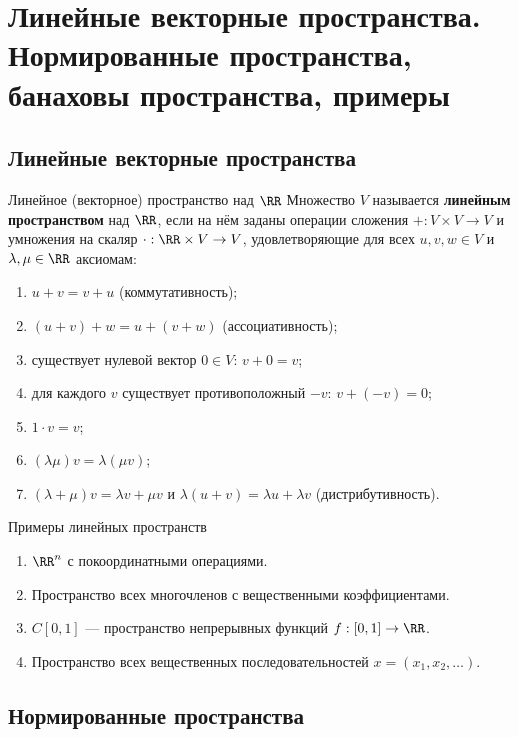 
\section{Линейные векторные пространства. Нормированные пространства, банаховы пространства, примеры}

\subsection*{Линейные векторные пространства}

\begin{Definition}{Линейное (векторное) пространство над $\RR$}{}
	Множество $V$ называется \textbf{линейным пространством} над $\RR$, если на
	нём заданы операции сложения $+:V\times V\to V$ и умножения на скаляр
	$\cdot:\RR\times V\to V$, удовлетворяющие для всех $u,v,w\in V$ и
	$\lambda,\mu\in\RR$ аксиомам:
	\begin{enumerate}
		\item $u+v=v+u$ (коммутативность);
		\item $(u+v)+w=u+(v+w)$ (ассоциативность);
		\item существует нулевой вектор $0\in V$: $v+0=v$;
		\item для каждого $v$ существует противоположный $-v$: $v+(-v)=0$;
		\item $1\cdot v=v$;
		\item $(\lambda\mu)v=\lambda(\mu v)$;
		\item $(\lambda+\mu)v=\lambda v+\mu v$ и $\lambda(u+v)=\lambda u+\lambda v$
		(дистрибутивность).
	\end{enumerate}
\end{Definition}

\begin{Example}{Примеры линейных пространств}{}
	\begin{enumerate}
		\item $\RR^n$ с покоординатными операциями.
		\item Пространство всех многочленов с вещественными коэффициентами.
		\item $C[0,1]$ --- пространство непрерывных функций $f:[0,1]\to\RR$.
		\item Пространство всех вещественных последовательностей
		$x=(x_1,x_2,\dots)$.
	\end{enumerate}
\end{Example}

\subsection*{Нормированные пространства}

